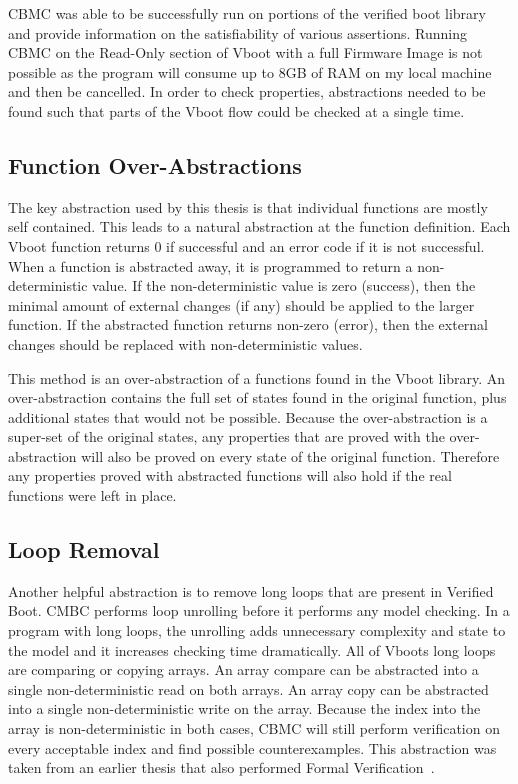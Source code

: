CBMC was able to be successfully run on portions of the verified boot library and provide information on the satisfiability of various assertions.
Running CBMC on the Read-Only section of Vboot with a full Firmware Image is not possible as the program will consume up to 8GB of RAM on my local machine and then be cancelled.
In order to check properties, abstractions needed to be found such that parts of the Vboot flow could be checked at a single time.

\subsection{Function Over-Abstractions}

The key abstraction used by this thesis is that individual functions are mostly
self contained.
This leads to a natural abstraction at the function definition.
Each Vboot function returns 0 if successful and an error code if it is not successful.
When a function is abstracted away, it is programmed to return a
non-deterministic value.
If the non-deterministic value is zero (success), then the minimal amount of external changes (if any) should be applied to the larger function.
If the abstracted function returns non-zero (error), then the external changes should be replaced with non-deterministic values.

This method is an over-abstraction of a functions found in the Vboot library.
An over-abstraction contains the full set of states found in the original function, plus additional states that would not be possible.
Because the over-abstraction is a super-set of the original states, any properties that are proved with the over-abstraction will also be proved on every state of the original function.
Therefore any properties proved with abstracted functions will also hold if the real functions were left in place.

\subsection{Loop Removal}

Another helpful abstraction is to remove long loops that are present in Verified
Boot.
CMBC performs loop unrolling before it performs any model checking. 
In a program with long loops, the unrolling adds unnecessary complexity and
state to the model and it increases checking time dramatically.
All of Vboots long loops are comparing or copying arrays.
An array compare can be abstracted into a single non-deterministic read on both
arrays.
An array copy can be abstracted into a single non-deterministic write on the
array.
Because the index into the array is non-deterministic in both cases, CBMC will
still perform verification on every acceptable index and find possible
counterexamples.
This abstraction was taken from an earlier thesis that also performed Formal
Verification~\cite{elane}. 


